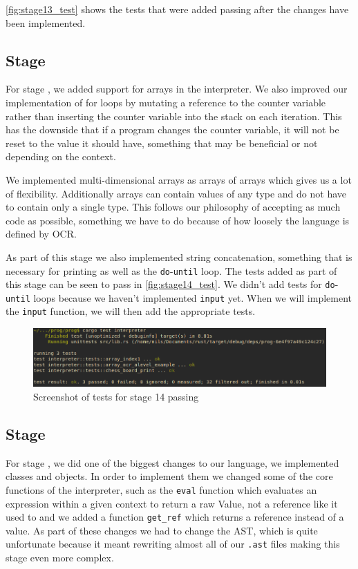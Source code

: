 \documentclass{article}
\newcommand{\subsecnum}{\the\value{subsection}}
\begin{document}
\autoref{fig:stage13_test} shows the tests that were added passing after the
changes have been implemented.

\subsection{Stage \subsecnum}

For stage \subsecnum, we added support for arrays in the interpreter. We also
improved our implementation of for loops by mutating a reference to the counter
variable rather than inserting the counter variable into the stack on each
iteration. This has the downside that if a program changes the counter
variable, it will not be reset to the value it should have, something that may
be beneficial or not depending on the context.

We implemented multi-dimensional arrays as arrays of arrays which gives us a
lot of flexibility. Additionally arrays can contain values of any type and do
not have to contain only a single type. This follows our philosophy of
accepting as much code as possible, something we have to do because of how
loosely the language is defined by OCR.

As part of this stage we also implemented string concatenation, something that
is necessary for printing as well as the \texttt{do}-\texttt{until} loop. The
tests added as part of this stage can be seen to pass in
\autoref{fig:stage14_test}. We didn't add tests for \texttt{do}-\texttt{until}
loops because we haven't implemented \texttt{input} yet. When we will implement
the \texttt{input} function, we will then add the appropriate tests.

\begin{figure}
	\includegraphics[width=\textwidth]{stage14_test}
	\caption{Screenshot of tests for stage 14 passing}
	\label{fig:stage14_test}
\end{figure}

\subsection{Stage \subsecnum}

For stage \subsecnum, we did one of the biggest changes to our language, we
implemented classes and objects. In order to implement them we changed some of
the core functions of the interpreter, such as the \texttt{eval} function which
evaluates an expression within a given context to return a raw Value, not a
reference like it used to and we added a function \texttt{get\_ref} which
returns a reference instead of a value. As part of these changes we had to
change the AST, which is quite unfortunate because it meant rewriting almost
all of our \texttt{.ast} files making this stage even more complex.
\end{document}

